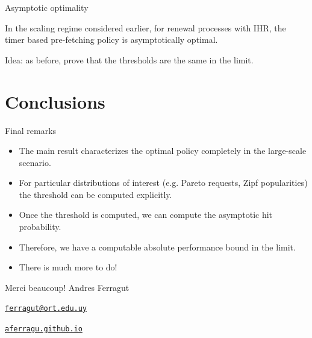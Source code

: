 \documentclass[aspectratio=169]{beamer}
\newenvironment*{myitem}[1][1.5em]{\begin{itemize}\setlength{\itemsep}{#1}}{\end{itemize}}
\begin{document}
\begin{frame}{Asymptotic optimality}

	\begin{theorem}

		In the scaling regime considered earlier, for renewal processes with IHR, the \alert{timer based pre-fetching policy} is asymptotically optimal.
	\end{theorem}
	\vfill
	\alert{Idea:} as before, prove that the thresholds are the same in the limit.

\end{frame}

\section{Conclusions}

\begin{frame}{Final remarks}
	
	\begin{myitem}[2em]
		\item The main result characterizes the optimal policy completely in the large-scale scenario.
		
		\item For particular distributions of interest (e.g. Pareto requests, Zipf popularities) the threshold can be computed explicitly.
		
		\item Once the threshold is computed, we can compute the asymptotic hit probability.
		
		\item Therefore, we have a computable absolute performance bound in the limit.
		\pause
		\item There is much more to do!
		
	\end{myitem}
\end{frame}


\begin{frame}[plain]
	\vfill
	{\Huge \alert{Merci beaucoup!}}
	\vfill
	Andres Ferragut

	\href{mailto://ferragut@ort.edu.uy}{\alert{\texttt{ferragut@ort.edu.uy}}}
	
	\href{http://aferragu.github.io}{\alert{\texttt{aferragu.github.io}}}
\end{frame}
\end{document}
